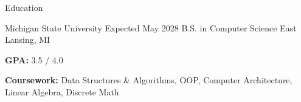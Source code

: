 \documentclass[
	11pt
]{../../../template}
\begin{document}
	\begin{rSection}{E}{ducation}
		\begin{rSectionEntry}
			{Michigan State University}
			{Expected May 2028}
			{B.S. in Computer Science}
			{}
			{East Lansing, MI}

			\item \textbf{GPA:} 3.5 / 4.0
			\item \textbf{Coursework:} Data Structures \& Algorithms, OOP, Computer Architecture, Linear Algebra, Discrete Math
		\end{rSectionEntry}
	\end{rSection}

\end{document}
